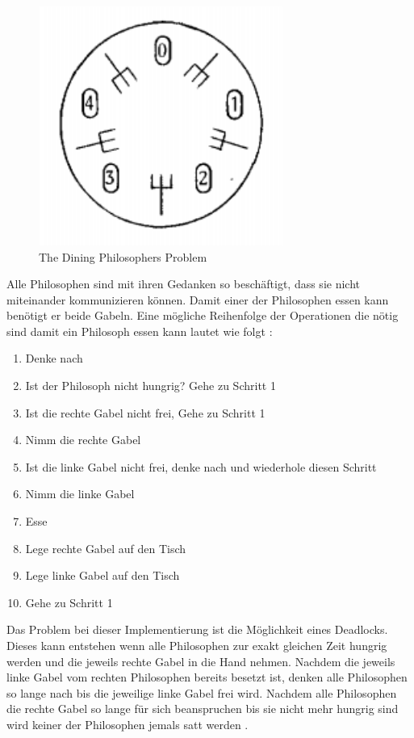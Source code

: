 \begin{figure}[!htb]
  \centering
  \includegraphics[width=8cm]{images/philosophers.png}
  \caption{
    The Dining Philosophers Problem \cite[p. 21]{dij71} 
  }
  \label{figure:philosophers}
\end{figure}

Alle Philosophen sind mit ihren Gedanken so beschäftigt, dass sie nicht miteinander kommunizieren können. Damit einer der Philosophen essen kann benötigt er beide Gabeln. Eine mögliche Reihenfolge der Operationen die nötig sind damit ein Philosoph essen kann lautet wie folgt \cite[p. 21]{dij71}:

\begin{enumerate}
  \item Denke nach
  \item Ist der Philosoph nicht hungrig? Gehe zu Schritt 1
  \item Ist die rechte Gabel nicht frei, Gehe zu Schritt 1
  \item Nimm die rechte Gabel
  \item Ist die linke Gabel nicht frei, denke nach und wiederhole diesen Schritt
  \item Nimm die linke Gabel
  \item Esse
  \item Lege rechte Gabel auf den Tisch  
  \item Lege linke Gabel auf den Tisch
  \item Gehe zu Schritt 1
\end{enumerate}

Das Problem bei dieser Implementierung ist die Möglichkeit eines Deadlocks. Dieses kann entstehen wenn alle Philosophen zur exakt gleichen Zeit hungrig werden und die jeweils rechte Gabel in die Hand nehmen. Nachdem die jeweils linke Gabel vom rechten Philosophen bereits besetzt ist, denken alle Philosophen so lange nach bis die jeweilige linke Gabel frei wird. Nachdem alle Philosophen die rechte Gabel so lange für sich beanspruchen bis sie nicht mehr hungrig sind wird keiner der Philosophen jemals satt werden \cite[p. 21]{dij71}. 

